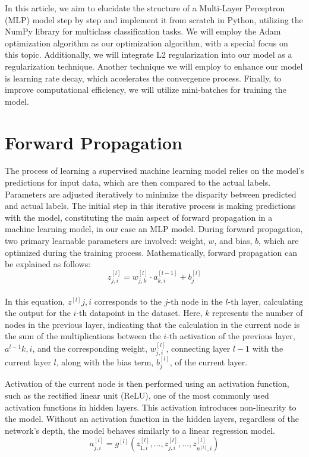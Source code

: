 \documentclass[12pt]{article}
\begin{document}
In this article, we aim to elucidate the structure of a Multi-Layer Perceptron (MLP) model step by step and implement it from scratch in Python, utilizing the NumPy library for multiclass classification tasks. We will employ the Adam optimization algorithm as our optimization algorithm, with a special focus on this topic. Additionally, we will integrate L2 regularization into our model as a regularization technique. Another technique we will employ to enhance our model is learning rate decay, which accelerates the convergence process. Finally, to improve computational efficiency, we will utilize mini-batches for training the model.

\section*{\large Forward Propagation}

The process of learning a supervised machine learning model relies on the model's predictions for input data, which are then compared to the actual labels. Parameters are adjusted iteratively to minimize the disparity between predicted and actual labels. The initial step in this iterative process is making predictions with the model, constituting the main aspect of forward propagation in a machine learning model, in our case an MLP model. During forward propagation, two primary learnable parameters are involved: weight, $w$, and bias, $b$, which are optimized during the training process. Mathematically, forward propagation can be explained as follows:\\[15px]
$$z^{[l]}_{j,i}=w^{[l]}_{j,k}\cdot a^{[l-1]}_{k,i}+b^{[l]}_j$$\\[6px]

In this equation, $z^{[l]}{j,i}$ corresponds to the $j$-th node in the $l$-th layer, calculating the output for the $i$-th datapoint in the dataset. Here, $k$ represents the number of nodes in the previous layer, indicating that the calculation in the current node is the sum of the multiplications between the $i$-th activation of the previous layer, $a^{l-1}{k,i}$, and the corresponding weight, $w^{[l]}_{j,i}$,  connecting layer $l-1$ with the current layer $l$, along with the bias term, $b^{[l]}_j$, of the current layer.

Activation of the current node is then performed using an activation function, such as the rectified linear unit (ReLU), one of the most commonly used activation functions in hidden layers. This activation introduces non-linearity to the model. Without an activation function in the hidden layers, regardless of the network's depth, the model behaves similarly to a linear regression model.\\[15px]
$$a^{[l]}_{j,i}=g^{[l]}\left({z^{[l]}_{1,i},\ldots, z^{[l]}_{j,i},\ldots, z^{[l]}_{n^{[l]},i}}\right)$$\\[6px]
\end{document}
